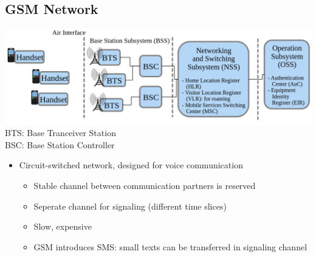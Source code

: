\subsection{GSM Network}
\includegraphics[width=0.9\columnwidth]{Resources/gsm.png}\\
BTS: Base Tranceiver Station\\
BSC: Base Station Controller\\
\begin{itemize}
  \item Circuit-switched network, designed for voice communication
    \begin{itemize}
      \item Stable channel between communication partners is reserved
      \item Seperate channel for signaling (different time slices)
      \item Slow, expensive
      \item GSM introduces SMS: small texts can be transferred in signaling channel
    \end{itemize}
\end{itemize}

